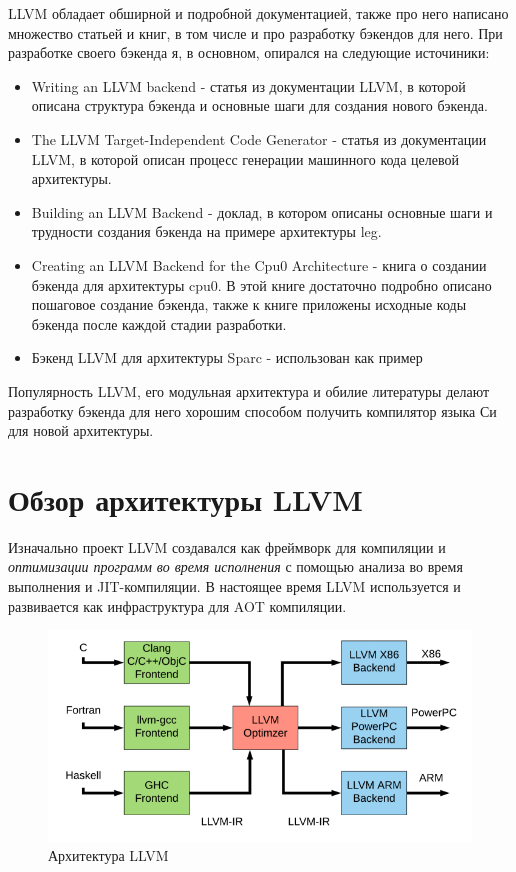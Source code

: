 \documentclass[a4paper,14pt]{extarticle}
\begin{document}
LLVM обладает обширной и подробной документацией, также про него написано множество статьей и книг, в том числе и про разработку бэкендов для него. При разработке своего бэкенда я, в основном, опирался на следующие источиники:
\begin{itemize}
	\item Writing an LLVM backend\cite{llvm:writing_backend} - статья из документации LLVM, в которой описана структура бэкенда и основные шаги для создания нового бэкенда.
	\item The LLVM Target-Independent Code Generator\cite{llvm:codegen} - статья из документации LLVM, в которой описан процесс генерации машинного кода целевой архитектуры.
	\item Building an LLVM Backend\cite{llvmleg} - доклад, в котором описаны основные шаги и трудности создания бэкенда на примере архитектуры leg.
	\item Creating an LLVM Backend for the Cpu0 Architecture\cite{cpu0} - книга о создании бэкенда для архитектуры cpu0. В этой книге достаточно подробно описано пошаговое создание бэкенда, также к книге приложены исходные коды бэкенда после каждой стадии разработки.
	\item Бэкенд LLVM для архитектуры Sparc\cite{llvm:sparc} - использован как пример
\end{itemize}

Популярность  LLVM, его модульная архитектура и обилие литературы делают разработку бэкенда для него хорошим способом получить компилятор языка Си для новой архитектуры.

\pagebreak
\section{Обзор архитектуры LLVM}

Изначально проект LLVM создавался как фреймворк для компиляции и \emph{оптимизации программ во время исполнения} с помощью анализа во время выполнения и JIT-компиляции\cite{LLVM:CGO04}. В настоящее время LLVM используется и развивается как инфраструктура для AOT компиляции.
\begin{figure}[!h]
	\begin{center}
		\includegraphics[width=\textwidth]{LLVM-Compiler-Development-architecture.png}
		\caption{Архитектура LLVM \cite{llvmpic}}
	\end{center}
\end{figure}
\end{document}
